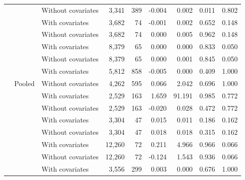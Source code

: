 \documentclass[
  12pt,
]{article}
\begin{document}
\begin{table}[H]
\begin{tabular}[t]{lllrrrrrr}
 & \multirow{-2}{*}{\raggedright\arraybackslash 20000} & Without covariates & 3,341 & 389 & -0.004 & 0.002 & 0.011 & 0.802\\


 &  & With covariates & 3,682 & 74 & -0.001 & 0.002 & 0.652 & 0.148\\


 & \multirow{-2}{*}{\raggedright\arraybackslash 40000} & Without covariates & 3,682 & 74 & 0.000 & 0.005 & 0.962 & 0.148\\


 &  & With covariates & 8,379 & 65 & 0.000 & 0.000 & 0.833 & 0.050\\


 & \multirow{-2}{*}{\raggedright\arraybackslash 60000} & Without covariates & 8,379 & 65 & 0.000 & 0.001 & 0.845 & 0.050\\


 &  & With covariates & 5,812 & 858 & -0.005 & 0.000 & 0.409 & 1.000\\


\multirow{-8}{*}{\raggedright\arraybackslash 2010} & \multirow{-2}{*}{\raggedright\arraybackslash Pooled} & Without covariates & 4,262 & 595 & 0.066 & 2.042 & 0.696 & 1.000\\

\cmidrule{1-9}
 &  & With covariates & 2,529 & 163 & 1.659 & 91.191 & 0.985 & 0.772\\


 & \multirow{-2}{*}{\raggedright\arraybackslash 20000} & Without covariates & 2,529 & 163 & -0.020 & 0.028 & 0.472 & 0.772\\


 &  & With covariates & 3,304 & 47 & 0.015 & 0.011 & 0.186 & 0.162\\


 & \multirow{-2}{*}{\raggedright\arraybackslash 40000} & Without covariates & 3,304 & 47 & 0.018 & 0.018 & 0.315 & 0.162\\


 &  & With covariates & 12,260 & 72 & 0.211 & 4.966 & 0.966 & 0.066\\


 & \multirow{-2}{*}{\raggedright\arraybackslash 60000} & Without covariates & 12,260 & 72 & -0.124 & 1.543 & 0.936 & 0.066\\


 &  & With covariates & 3,556 & 299 & 0.003 & 0.000 & 0.676 & 1.000\\



\end{tabular}
\end{table}
\end{document}
